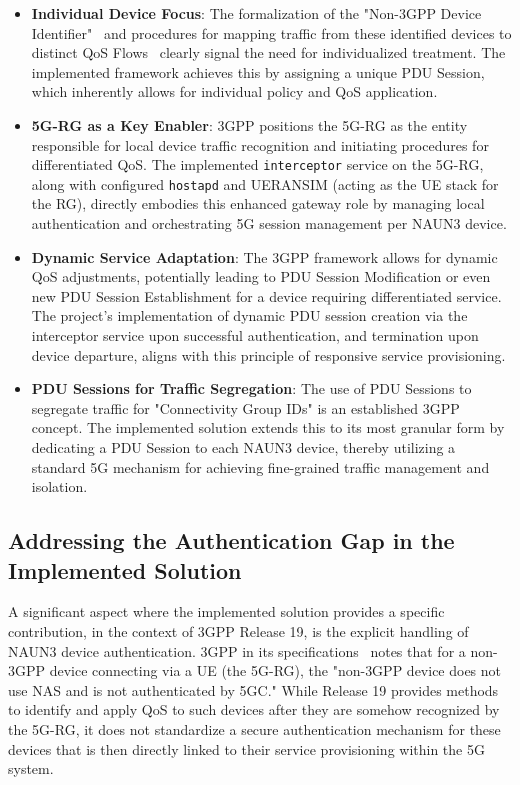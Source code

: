 \begin{itemize}
    \item \textbf{Individual Device Focus}: The formalization of the "Non-\ac{3GPP} Device Identifier"~\cite{23.501-p564} and procedures for mapping traffic from these identified devices to distinct \ac{QoS} Flows~\cite{23.316-p95} clearly signal the need for individualized treatment. The implemented framework achieves this by assigning a unique \ac{PDU} Session, which inherently allows for individual policy and \ac{QoS} application.
    
    \item \textbf{\ac{5G-RG} as a Key Enabler}: \ac{3GPP} positions the \ac{5G-RG} as the entity responsible for local device traffic recognition and initiating procedures for differentiated \ac{QoS}. The implemented \texttt{interceptor} service on the \ac{5G-RG}, along with configured \texttt{hostapd} and UERANSIM (acting as the \ac{UE} stack for the \ac{RG}), directly embodies this enhanced gateway role by managing local authentication and orchestrating \ac{5G} session management per \ac{NAUN3} device.
    
    \item \textbf{Dynamic Service Adaptation}: The \ac{3GPP} framework allows for dynamic \ac{QoS} adjustments, potentially leading to \ac{PDU} Session Modification or even new \ac{PDU} Session Establishment for a device requiring differentiated service. The project's implementation of dynamic \ac{PDU} session creation via the interceptor service upon successful authentication, and termination upon device departure, aligns with this principle of responsive service provisioning.
    
    \item \textbf{\ac{PDU} Sessions for Traffic Segregation}: The use of \ac{PDU} Sessions to segregate traffic for "Connectivity Group IDs" is an established \ac{3GPP} concept. The implemented solution extends this to its most granular form by dedicating a \ac{PDU} Session to each \ac{NAUN3} device, thereby utilizing a standard \ac{5G} mechanism for achieving fine-grained traffic management and isolation.
\end{itemize}

\subsection{Addressing the Authentication Gap in the Implemented Solution}

A significant aspect where the implemented solution provides a specific contribution, in the context of \ac{3GPP} Release 19, is the explicit handling of \ac{NAUN3} device authentication. 3GPP in its specifications~\cite{23.501-p564} notes that for a non-\ac{3GPP} device connecting via a \ac{UE} (the \ac{5G-RG}), the "non-\ac{3GPP} device does not use \ac{NAS} and is not authenticated by \ac{5GC}." While Release 19 provides methods to identify and apply \ac{QoS} to such devices after they are somehow recognized by the \ac{5G-RG}, it does not standardize a secure authentication mechanism for these devices that is then directly linked to their service provisioning within the \ac{5G} system.

